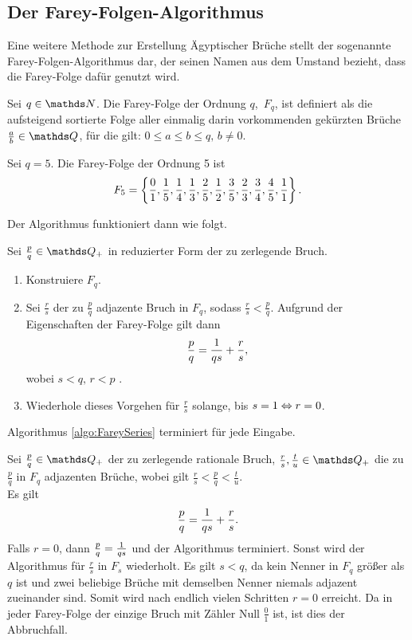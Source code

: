 \subsection{Der Farey-Folgen-Algorithmus}
Eine weitere Methode zur Erstellung Ägyptischer Brüche stellt der sogenannte Farey-Folgen-Algorithmus dar, der seinen Namen aus dem Umstand bezieht, dass die Farey-Folge dafür genutzt wird.
\begin{def1}
	Sei $q \in \N$. Die Farey-Folge der Ordnung $q$, $\, F_q$, ist definiert als die aufsteigend sortierte Folge aller einmalig darin vorkommenden gekürzten Brüche $\frac{a}{b} \in \Q$, für die gilt:
	$0\leq a \leq b \leq q,\, b\neq 0$.
\end{def1}

\begin{bsp}
	Sei $q=5$. Die Farey-Folge der Ordnung 5 ist
	$$F_5 = \left\{\frac{0}{1}, \frac{1}{5}, \frac{1}{4}, \frac{1}{3}, \frac{2}{5}, \frac{1}{2}, \frac{3}{5}, \frac{2}{3}, \frac{3}{4}, \frac{4}{5}, \frac{1}{1} \right\}.$$
\end{bsp}

Der Algorithmus funktioniert dann wie folgt.
\begin{algorithm}\label{algo:FareySeries}
	Sei $\frac{p}{q} \in \Q_+$ in reduzierter Form der zu zerlegende Bruch.
	\begin{enumerate}
		\item Konstruiere $F_q$.
		\item Sei $\frac{r}{s}$ der zu $\frac{p}{q}$ adjazente Bruch in $F_q$, sodass $\frac{r}{s} < \frac{p}{q}$. Aufgrund der Eigenschaften der Farey-Folge gilt dann
		$$\frac{p}{q} = \frac{1}{qs} + \frac{r}{s},$$ wobei $s<q,\, r<p$ \cite[S. 425]{Beck2000}.
		\item Wiederhole dieses Vorgehen für $\frac{r}{s}$ solange, bis $s=1 \Leftrightarrow r=0$.
	\end{enumerate}
\end{algorithm}
\begin{satz}
	Algorithmus \ref{algo:FareySeries} terminiert für jede Eingabe.
\end{satz}
\begin{bew}
	Sei $\frac{p}{q} \in \Q_+$ der zu zerlegende rationale Bruch, $\frac{r}{s}, \frac{t}{u} \in \Q_+$ die zu $\frac{p}{q}$ in $F_q$ adjazenten Brüche, wobei gilt $\frac{r}{s}<\frac{p}{q} < \frac{t}{u}$.\\
	Es gilt $$\frac{p}{q} = \frac{1}{qs}+\frac{r}{s}.$$
	Falls $r = 0$, dann $\frac{p}{q} = \frac{1}{qs}$ und der Algorithmus terminiert.
	Sonst wird der Algorithmus für $\frac{r}{s}$ in $F_s$ wiederholt. Es gilt $s<q$, da kein Nenner in $F_q$ größer als $q$ ist und zwei beliebige Brüche mit demselben Nenner niemals adjazent zueinander sind. Somit wird nach endlich vielen Schritten $r=0$ erreicht. Da in jeder Farey-Folge der einzige Bruch mit Zähler Null $\frac{0}{1}$ ist, ist dies der Abbruchfall.
\end{bew}

